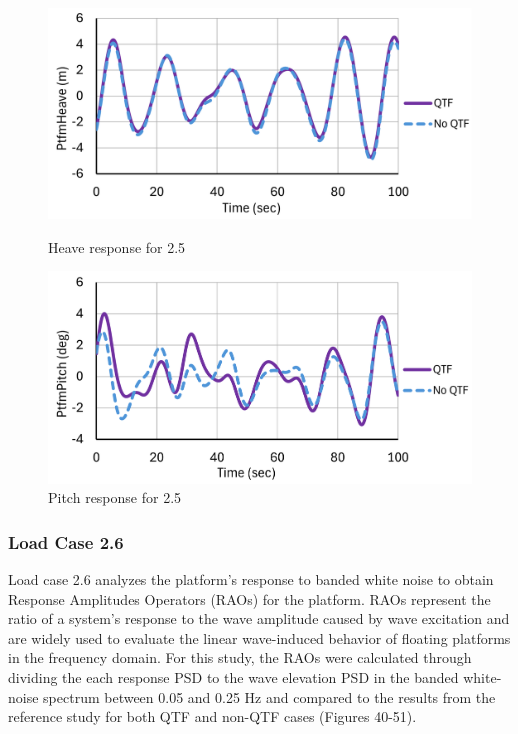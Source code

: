 \documentclass[a4paper, 11pt]{article}
\begin{document}
\begin{figure}[H]
    \begin{minipage}{0.49\textwidth}
        \centering
        \includegraphics[width=1\textwidth]{2.5_heave.png}
        \caption{\small Heave response for 2.5}
        \label{fig:2.5_heave}
    \end{minipage}
    \hfill
    \begin{minipage}{0.49\textwidth}
        \centering
        \vspace{-0.3cm}
        \includegraphics[width=1\textwidth]{2.5_pitch.png}
        \caption{\small Pitch response for 2.5}
        \label{fig:2.5_pitch}
    \end{minipage}
\end{figure}

\subsubsection{Load Case 2.6}
Load case 2.6 analyzes the platform's response to banded white noise to obtain Response Amplitudes Operators (RAOs) for the platform. RAOs represent the ratio of a system's response to the wave amplitude caused by wave excitation and are widely used to evaluate the linear wave-induced behavior of floating platforms in the frequency domain. For this study, the RAOs were calculated through dividing the each response PSD to the wave elevation PSD in the banded white-noise spectrum between 0.05 and 0.25 Hz and compared to the results from the reference study for both QTF and non-QTF cases (Figures 40-51).
\end{document}
